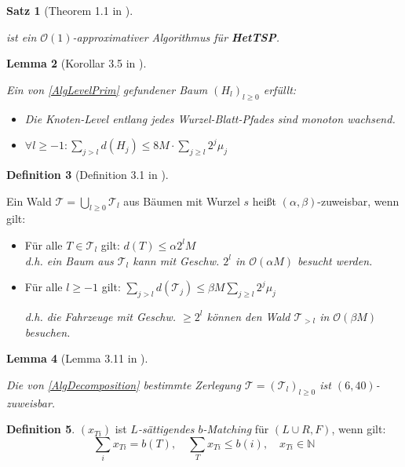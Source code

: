 \documentclass[a4paper,ngerman,12pt,bibtotoc]{scrartcl}
\theoremstyle{definition}
\newtheorem{defn}{Definition}
\theoremstyle{plain}
\newtheorem{lemma}[defn]{Lemma}
\newtheorem{satz}[defn]{Satz}
\theoremstyle{remark}
\newcommand{\NN}{\mathbb{N}}
\newcommand{\Tc}{\mathcal{T}}
\newcommand{\Oc}{\mathcal{O}}
\newcommand{\HetTSP}{\textbf{HetTSP}}
\begin{document}
	\begin{minipage}{0.45\textwidth}
		\vspace{4em}
		
		\begin{satz}[Theorem 1.1 in \cite{HetCVRP}]~
			
			 ist ein $\Oc(1)$-approximativer Algorithmus für \HetTSP.
		\end{satz}
		
		\vspace{3em}

		\begin{lemma}[Korollar 3.5 in \cite{HetCVRP}]~
			
			Ein von \cref{AlgLevelPrim} gefundener Baum $\left(H_l\right)_{l\geq 0}$ erfüllt:
			\begin{itemize}
				\item Die Knoten-Level entlang jedes Wurzel-Blatt-Pfades sind monoton wachsend.
				\item $\forall l\geq -1: \sum_{j>l} d(H_j) \leq 8M\cdot \sum_{j\geq l}2^j\mu_j$
			\end{itemize}
		\end{lemma}

		\begin{defn}[Definition 3.1 in \cite{HetCVRP}]~
			
			Ein Wald $\Tc = \bigcup_{l\geq 0} \Tc_l$ aus Bäumen mit Wurzel $s$ heißt $(\alpha, \beta)$-zuweisbar, wenn gilt:
			\begin{itemize}
				\item Für alle $T \in \Tc_l$ gilt: $d(T) \leq \alpha 2^l M$ \\
				\textit{d.h. ein Baum aus $\Tc_l$ kann mit Geschw. $2^l$ in $\Oc(\alpha M)$ besucht werden.}
				\item Für alle $l \geq -1$ gilt: $\sum_{j > l} d(\Tc_j) \leq \beta M \sum_{j\geq l} 2^j\mu_j$
				
				\textit{d.h. die Fahrzeuge mit Geschw. $\geq 2^l$ können den Wald $\Tc_{>l}$ in $\Oc(\beta M)$ besuchen.}
			\end{itemize}
		\end{defn}
		
		\begin{lemma}[Lemma 3.11 in \cite{HetCVRP}]~
			
			Die von \cref{AlgDecomposition} bestimmte Zerlegung $\Tc = (\Tc_l)_{l\geq 0}$ ist $(6, 40)$-zuweisbar.
		\end{lemma}

		\begin{defn}
			$(x_{Ti})$ ist \emph{$L$-sättigendes $b$-Matching} für $(L\cup R, F)$, wenn gilt:
			\[\sum_i x_{Ti} = b(T),\quad \sum_T x_{Ti} \leq b(i),\quad x_{Ti}\in\NN\]
		\end{defn}
		

\end{minipage}
\end{document}
